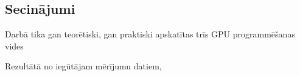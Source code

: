 \begin{center}
    \chapter{Secinājumi}
\end{center}

Darbā tika gan teorētiski, gan praktiski apskatītas trīs GPU programmēšanas
vides


Rezultātā no iegūtājam mērījumu datiem,
